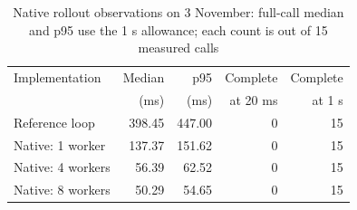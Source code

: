 \begin{table}[t]
\caption{Native rollout observations on 3 November: full-call median and p95 use the 1 s allowance; each count is out of 15 measured calls}
\label{tab:native}
\centering\small
\begin{tabular}{lrrrr}
\toprule
Implementation & Median & p95 & Complete & Complete\\
 & (ms) & (ms) & at 20 ms & at 1 s\\
\midrule
Reference loop & 398.45 & 447.00 & 0 & 15\\
Native: 1 worker & 137.37 & 151.62 & 0 & 15\\
Native: 4 workers & 56.39 & 62.52 & 0 & 15\\
Native: 8 workers & 50.29 & 54.65 & 0 & 15\\
\bottomrule
\end{tabular}
\end{table}
